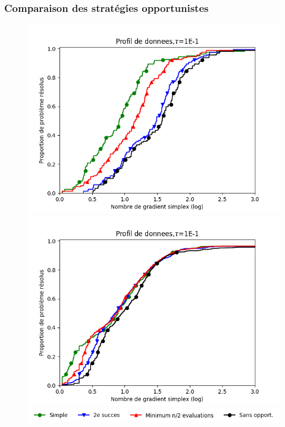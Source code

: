 \documentclass{beamer}
\begin{document}
\begin{frame}
\frametitle{Comparaison des stratégies opportunistes}
\noindent
\begin{center}
\begin{figure}
\vspace{-1em}
\begin{minipage}[t]{0.45\linewidth}
\includegraphics[width=\linewidth]{coppcomp.png}
\end{minipage}
\hfill%
\begin{minipage}[t]{0.45\linewidth}
\includegraphics[width=\linewidth]{moppcomp.png}
\end{minipage}
\includegraphics[width=\linewidth]{Legende_comp.png}

\end{figure}
\end{center}
\end{frame}
\end{document}
